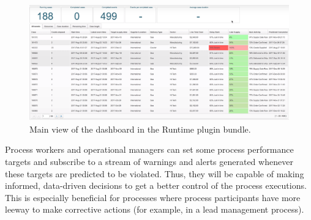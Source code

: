 \documentclass[runningheads,a4paper]{llncs}
\begin{document}



\vspace{-\baselineskip}
\begin{figure}
	\centering
	\includegraphics[width=\textwidth]{img/nirdizati-runtime}
	\caption{Main view of the dashboard in the Runtime plugin bundle.}
	\label{fig:nirdizati-runtime}
	\vspace{-\baselineskip}
\end{figure}

Process workers and operational managers can set some process performance targets and subscribe to a stream of warnings and alerts generated whenever these targets are predicted to be violated. Thus, they will be capable of making informed, data-driven decisions to get a better control of the process executions. This is especially beneficial for processes where process participants have more leeway to make corrective actions (for example, in a lead management process).
\end{document}
